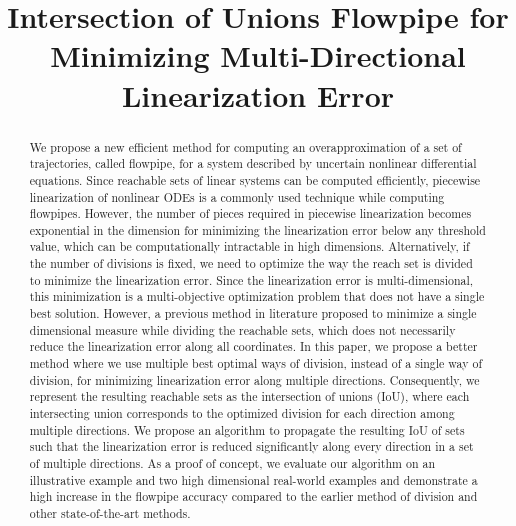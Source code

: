 


\title{Intersection of Unions Flowpipe for Minimizing Multi-Directional Linearization Error}
\author{}
\institute{}
%
    
\maketitle
%
\begin{abstract}
We propose a new efficient method for computing an overapproximation
of a set of trajectories, called flowpipe, for a system
described by uncertain nonlinear differential equations.  Since
reachable sets of linear systems can be computed efficiently,
piecewise linearization of nonlinear ODEs is a commonly used technique
while computing flowpipes.  However, the number of pieces required in
piecewise linearization becomes exponential in the dimension for
minimizing the linearization error below any threshold value, which
can be computationally intractable in high dimensions.  Alternatively,
if the number of divisions is fixed, we need to optimize the way the
reach set is divided to minimize the linearization error.  Since the
linearization error is multi-dimensional, this minimization is a
multi-objective optimization problem that does not have a single best
solution.  However, a previous method in literature proposed to
minimize a single dimensional measure while dividing the reachable
sets, which does not necessarily reduce the linearization error along
all coordinates.  In this paper, we propose a better method where we
use multiple best optimal ways of division, instead of a single way of
division, for minimizing linearization error along multiple
directions.  Consequently, we represent the resulting reachable sets
as the intersection of unions (IoU), where each intersecting union
corresponds to the optimized division for each direction among
multiple directions.  We propose an algorithm to propagate the
resulting IoU of sets such that the linearization error is reduced
significantly along every direction in a set of multiple directions.
As a proof of concept, we evaluate our algorithm on an illustrative
example and two high dimensional real-world examples and demonstrate a
high increase in the flowpipe accuracy compared to the earlier method
of division and other state-of-the-art methods.
\end{abstract}

